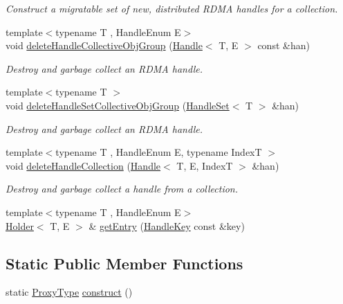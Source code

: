 \begin{DoxyCompactItemize}
\begin{DoxyCompactList}\small\item\em Construct a migratable set of new, distributed R\+D\+MA handles for a collection. \end{DoxyCompactList}\item 
{\footnotesize template$<$typename T , Handle\+Enum E$>$ }\\void \hyperlink{structvt_1_1rdma_1_1_manager_a4219310feca011fd242e654c9ba51280}{delete\+Handle\+Collective\+Obj\+Group} (\hyperlink{structvt_1_1rdma_1_1_handle}{Handle}$<$ T, E $>$ const \&han)
\begin{DoxyCompactList}\small\item\em Destroy and garbage collect an R\+D\+MA handle. \end{DoxyCompactList}\item 
{\footnotesize template$<$typename T $>$ }\\void \hyperlink{structvt_1_1rdma_1_1_manager_a9b3b9bf148a8225295879481345e4af3}{delete\+Handle\+Set\+Collective\+Obj\+Group} (\hyperlink{structvt_1_1rdma_1_1_handle_set}{Handle\+Set}$<$ T $>$ \&han)
\begin{DoxyCompactList}\small\item\em Destroy and garbage collect an R\+D\+MA handle. \end{DoxyCompactList}\item 
{\footnotesize template$<$typename T , Handle\+Enum E, typename IndexT $>$ }\\void \hyperlink{structvt_1_1rdma_1_1_manager_a3a1f982e986d58e91837a2b1aa048468}{delete\+Handle\+Collection} (\hyperlink{structvt_1_1rdma_1_1_handle}{Handle}$<$ T, E, IndexT $>$ \&han)
\begin{DoxyCompactList}\small\item\em Destroy and garbage collect a handle from a collection. \end{DoxyCompactList}\item 
{\footnotesize template$<$typename T , Handle\+Enum E$>$ }\\\hyperlink{structvt_1_1rdma_1_1_holder}{Holder}$<$ T, E $>$ \& \hyperlink{structvt_1_1rdma_1_1_manager_a60c463246971a6d782e55f13fd60d092}{get\+Entry} (\hyperlink{structvt_1_1rdma_1_1_handle_key}{Handle\+Key} const \&key)
\end{DoxyCompactItemize}
\subsection*{Static Public Member Functions}
\begin{DoxyCompactItemize}
\item 
static \hyperlink{structvt_1_1rdma_1_1_manager_a75d5cdc6428ea19f5ec665b04dcd7166}{Proxy\+Type} \hyperlink{structvt_1_1rdma_1_1_manager_ac9119fca74dae512a87d2af6c03b15ed}{construct} ()
\end{DoxyCompactItemize}


